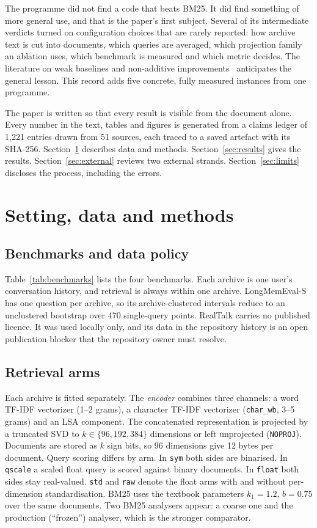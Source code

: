 \documentclass[11pt,a4paper]{article}
\begin{document}
The programme did not find a code that beats BM25. It did find something of more general use, and that is the paper's first subject. Several of its intermediate verdicts turned on configuration choices that are rarely reported: how archive text is cut into documents, which queries are averaged, which projection family an ablation uses, which benchmark is measured and which metric decides. The literature on weak baselines and non-additive improvements~\citep{armstrong2009improvements,lin2019neuralhype} anticipates the general lesson. This record adds five concrete, fully measured instances from one programme.

The paper is written so that every result is visible from the document alone. Every number in the text, tables and figures is generated from a claims ledger of 1{,}221 entries drawn from 51 sources, each traced to a saved artefact with its SHA-256. Section~\ref{sec:setting} describes data and methods. Section~\ref{sec:results} gives the results. Section~\ref{sec:external} reviews two external strands. Section~\ref{sec:limits} discloses the process, including the errors.

\section{Setting, data and methods}\label{sec:setting}
\subsection{Benchmarks and data policy}
Table~\ref{tab:benchmarks} lists the four benchmarks. Each archive is one user's conversation history, and retrieval is always within one archive. LongMemEval-S has one question per archive, so its archive-clustered intervals reduce to an unclustered bootstrap over 470 single-query points. RealTalk carries no published licence. It was used locally only, and its data in the repository history is an open publication blocker that the repository owner must resolve.



\subsection{Retrieval arms}
Each archive is fitted separately. The \emph{encoder} combines three channels: a word TF-IDF vectorizer (1--2 grams), a character TF-IDF vectorizer (\texttt{char\_wb}, 3--5 grams) and an LSA component. The concatenated representation is projected by a truncated SVD to $k\in\{96,192,384\}$ dimensions or left unprojected (\texttt{NOPROJ}). Documents are stored as $k$ sign bits, so 96 dimensions give 12 bytes per document. Query scoring differs by arm. In \texttt{sym} both sides are binarised. In \texttt{qscale} a scaled float query is scored against binary documents. In \texttt{float} both sides stay real-valued. \texttt{std} and \texttt{raw} denote the float arms with and without per-dimension standardisation. BM25 uses the textbook parameters $k_1=1.2$, $b=0.75$ over the same documents. Two BM25 analysers appear: a coarse one and the production (``frozen'') analyser, which is the stronger comparator.
\end{document}
